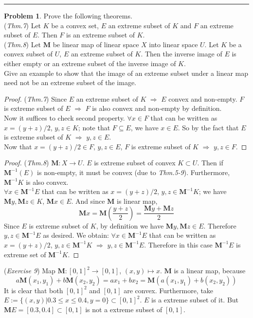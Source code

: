 \documentclass[a4paper, 10pt]{article}
\theoremstyle{definition}
\newtheorem{problem}{Problem}
\theoremstyle{hSol}
\begin{document}
\noindent\rule{16cm}{0.4pt}

\begin{problem} Prove the following theorems. \\
(\textit{Thm.7}) Let $K$ be a convex set, $E$ an extreme subset of $K$ and $F$ an extreme subset of $E$. Then $F$ is an extreme subset of $K$.\\
(\textit{Thm.8}) Let $\bm{M}$ be linear map of linear space $X$ into linear space $U$. Let $K$ be a convex subset of $U$, $E$ an extreme subset of $K$. Then the inverse image of $E$ is either empty or an extreme subset of the inverse image of $K$. \\
Give an example to show that the image of an extreme subset under a linear map need not be an extreme subset of the image.
\end{problem}
\begin{proof} (\textit{Thm.7}) Since $E$ an extreme subset of $K$ $\Rightarrow$ $E$ convex and non-empty. $F$ is extreme subset of $E$ $\Rightarrow$ $F$ is also convex and non-empty by definition. \\
Now it suffices to check second property. $\forall x \in F$ that can be written as $x=(y+z)/2$, $y,z\in K$; note that $F \subseteq E$, we have $x\in E$. So by the fact that $E$ is extreme subset of $K$ $\Rightarrow$ $y,z\in E$. \\
Now that $x=(y+z)/2 \in F$, $y,z\in E$, $F$ is extreme subset of $K$ $\Rightarrow$ $y,z \in F$.
\end{proof}
\begin{proof} (\textit{Thm.8}) $\bm{M}: X \to U$. $E$ is extreme subset of convex $K\subset U$. Then if $\bm{M}^{-1}(E)$ is non-empty, it must be convex (due to \textit{Thm.5-9}). Furthermore, $\bm{M}^{-1}K$ is also convex.\\
$\forall x\in \bm{M}^{-1}E$ that can be written as $x=(y+z)/2$, $y,z\in \bm{M}^{-1}K$; we have $\bm{M}y, \bm{M}z \in K$, $\bm{M}x \in E$. And since $\bm{M}$ is linear map,
\begin{equation}
  \bm{M}x = \bm{M}\left(\frac{y+z}{2}\right) = \frac{\bm{M}y + \bm{M}z}{2}
\end{equation}
Since $E$ is extreme subset of $K$, by definition we have $\bm{M}y, \bm{M}z \in E$. Therefore $y,z \in \bm{M}^{-1}E$ as desired. We obtain: $\forall x\in \bm{M}^{-1}E$ that can be written as $x=(y+z)/2$, $y,z\in \bm{M}^{-1}K$ $\Rightarrow$ $y,z \in \bm{M}^{-1}E$. Therefore in this case $\bm{M}^{-1}E$ is extreme set of $\bm{M}^{-1}K$.
\end{proof}
(\textit{Exercise 9}) Map $\bm{M}: [0,1]^2 \to [0,1]$, $(x,y) \mapsto x$. $\bm{M}$ is a linear map, because
\begin{equation}
  a\bm{M}(x_1,y_1)+b\bm{M}(x_2,y_2)=ax_1+bx_2=\bm{M}(a(x_1,y_1)+b(x_2,y_2))
\end{equation}
It is clear that both $[0,1]^2$ and $[0,1]$ are convex. Furthermore, take $E:=\{(x, y)|0.3\leq x \leq 0.4, y=0\} \subset [0,1]^2$. $E$ is a extreme subset of it. But $\bm{M}E=[0.3, 0.4]\subset [0,1]$ is not a extreme subset of $[0,1]$.
\end{document}
